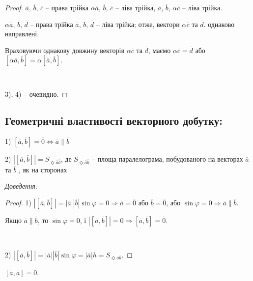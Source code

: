 \begin{proof}
	$\overline{a}$, $\overline{b}$, $\overline{c}$ -- права трійка $\alpha \overline{a}$,
	$\overline{b}$, $\overline{c}$ -- ліва трійка, $\overline{a}$, $\overline{b}$,
	$\alpha \overline{c}$ -- ліва трійка.
	
	$\alpha \overline{a}$, $\overline{b}$, $\overline{d}$ -- права трійка $\overline{a}$,
	$\overline{b}$, $\overline{d}$ -- ліва трійка; отже, вектори $\alpha \overline{c}$ та $\overline{d}$.
	однаково направлені.
	
	Враховуючи однакову довжину векторів $\alpha \overline{c}$ та $\overline{d}$, маємо
	$\alpha \overline{c} = \overline{d}$ або $[\alpha \overline{a}, \overline{b}]
	= \alpha [\overline{a}, \overline{b}]$.

	~

	3), 4) -- очевидно.
\end{proof}

\subsection*{Геометричні властивості векторного добутку:}

1) $[\overline{a}, \overline{b}] = \overline{0} \Leftrightarrow \overline{a} \parallel \overline{b}$

2) $|[\overline{a}, \overline{b}]| = S_{\Diamond \overline{a}\overline{b}}$, де
$S_{\Diamond \overline{a}\overline{b}}$ -- площа паралелограма, побудованого на векторах
$\overline{a}$ та $\overline{b}$ , як на сторонах

\textit{Доведення:}

\begin{proof}
	1) $|[\overline{a},\overline{b}]| = |\overline{a}| |\overline{b}| \sin\varphi = 0
	\Rightarrow \overline{a} = \overline{0}$ або $\overline{b} = \overline{0}$, або $\sin \varphi = 0
	\Rightarrow \overline{a} \parallel \overline{b}$.
	
	Якщо $\overline{a} \parallel \overline{b}$, то $\sin \varphi = 0$, і $|[\overline{a}, \overline{b}]| = 0
	\Rightarrow [\overline{a}, \overline{b}] = \overline{0}$.
	
	~	
	
	2) $|[\overline{a},\overline{b}]| = |\overline{a}| |\overline{b}| \sin \varphi = |\overline{a}| h
	= S_{\Diamond \overline{a}\overline{b}}$.
\end{proof}

\begin{claim}
	$[\overline{a}, \overline{a}] = 0$.
\end{claim}

